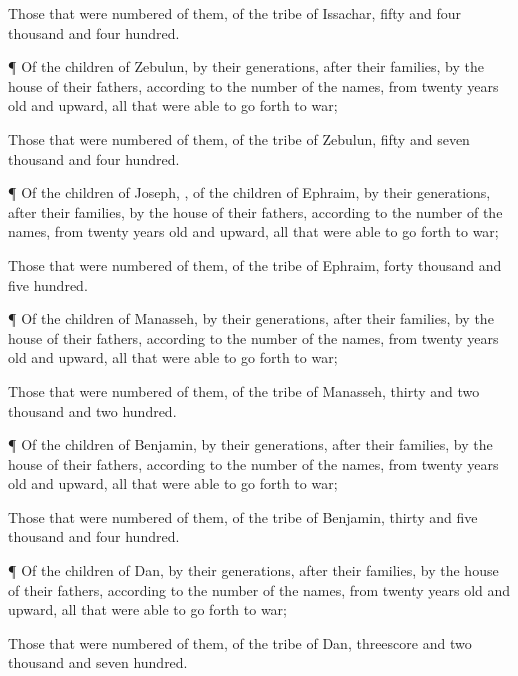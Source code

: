 {Those that were
numbered of them,
{} of the
tribe of
Issachar,
{}
fifty and
four
thousand and
four
hundred.


\par }{\PP {}¶ Of the
children of
Zebulun, by their
generations, after their
families, by the
house of their
fathers, according to the
number of the
names, from
twenty
years
old and
upward, all that were able to go
forth to
war;

Those that were
numbered of them,
{} of the
tribe of
Zebulun,
{}
fifty and
seven
thousand and
four
hundred.


\par }{\PP {}¶ Of the
children of
Joseph,
{}, of the
children of
Ephraim, by their
generations, after their
families, by the
house of their
fathers, according to the
number of the
names, from
twenty
years
old and
upward, all that were able to go
forth to
war;

Those that were
numbered of them,
{} of the
tribe of
Ephraim,
{}
forty
thousand and
five
hundred.


\par }{\PP {}¶ Of the
children of
Manasseh, by their
generations, after their
families, by the
house of their
fathers, according to the
number of the
names, from
twenty
years
old and
upward, all that were able to go
forth to
war;

Those that were
numbered of them,
{} of the
tribe of
Manasseh,
{}
thirty and
two
thousand and two
hundred.


\par }{\PP {}¶ Of the
children of
Benjamin, by their
generations, after their
families, by the
house of their
fathers, according to the
number of the
names, from
twenty
years
old and
upward, all that were able to go
forth to
war;

Those that were
numbered of them,
{} of the
tribe of
Benjamin,
{}
thirty and
five
thousand and
four
hundred.


\par }{\PP {}¶ Of the
children of
Dan, by their
generations, after their
families, by the
house of their
fathers, according to the
number of the
names, from
twenty
years
old and
upward, all that were able to go
forth to
war;

Those that were
numbered of them,
{} of the
tribe of
Dan,
{}
threescore and
two
thousand and
seven
hundred.


}
